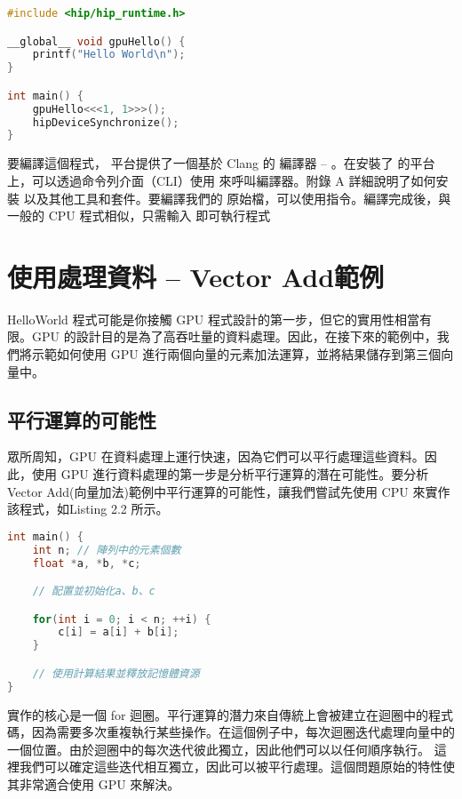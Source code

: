 \begin{lstlisting}[language=C, caption={「Hello World」\term{HIP}程式範例}, label={lst:example}]
#include <hip/hip_runtime.h>

__global__ void gpuHello() {
    printf("Hello World\n");
}

int main() {
    gpuHello<<<1, 1>>>();
    hipDeviceSynchronize();
}
\end{lstlisting}

要編譯這個程式， 平台提供了一個基於 Clang 的  編譯器 -- 。在安裝了  的平台上，可以透過命令列介面（CLI）使用  來呼叫編譯器。附錄 A 詳細說明了如何安裝  以及其他工具和套件。要編譯我們的  原始檔，可以使用指令。編譯完成後，與一般的 CPU 程式相似，只需輸入 即可執行程式

\section{使用處理資料 -- Vector Add範例}

HelloWorld 程式可能是你接觸 GPU 程式設計的第一步，但它的實用性相當有限。GPU 的設計目的是為了高吞吐量的資料處理。因此，在接下來的範例中，我們將示範如何使用 GPU 進行兩個向量的元素加法運算，並將結果儲存到第三個向量中。

\subsection{平行運算的可能性}

眾所周知，GPU 在資料處理上運行快速，因為它們可以平行處理這些資料。因此，使用 GPU 進行資料處理的第一步是分析平行運算的潛在可能性。要分析Vector Add(向量加法)範例中平行運算的可能性，讓我們嘗試先使用 CPU 來實作該程式，如Listing 2.2 所示。
\begin{lstlisting}[language=C, caption={\term{HIP} 錯誤偵測範例}, label={2nd:example}]
int main() {
    int n; // 陣列中的元素個數
    float *a, *b, *c;

    // 配置並初始化a、b、c

    for(int i = 0; i < n; ++i) {
        c[i] = a[i] + b[i];
    }

    // 使用計算結果並釋放記憶體資源
}
\end{lstlisting}

實作的核心是一個 for 迴圈。平行運算的潛力來自傳統上會被建立在迴圈中的程式碼，因為需要多次重複執行某些操作。在這個例子中，每次迴圈迭代處理向量中的一個位置。由於迴圈中的每次迭代彼此獨立，因此他們可以以任何順序執行。
這裡我們可以確定這些迭代相互獨立，因此可以被平行處理。這個問題原始的特性使其非常適合使用 GPU 來解決。


